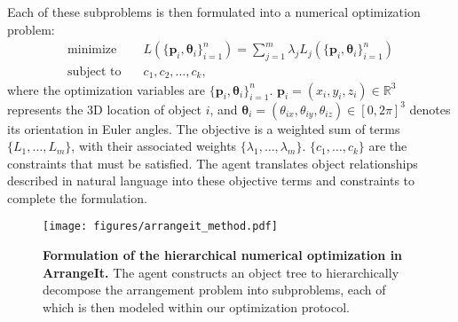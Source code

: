 Each of these subproblems is then formulated into a numerical optimization problem:
\begin{align*}
    \text{minimize} \quad & L(\{\mathbf{p}_i, \mathbf{\theta}_i\}_{i=1}^n) = \sum_{j=1}^{m} \lambda_j L_j(\{\mathbf{p}_i, \mathbf{\theta}_i\}_{i=1}^n) \\
    \text{subject to} \quad & c_1, c_2, \ldots, c_k,
\end{align*}
where the optimization variables are \(\{\mathbf{p}_i, \mathbf{\theta}_i\}_{i=1}^{n}\). \(\mathbf{p}_i = (x_i, y_i, z_i) \in \mathbb{R}^3\) represents the 3D location of object \(i\), and \(\mathbf{\theta}_i = (\theta_{ix}, \theta_{iy}, \theta_{iz}) \in [0, 2\pi]^3\) denotes its orientation in Euler angles.
The objective is a weighted sum of terms \(\{L_1, \ldots, L_m\}\), with their associated weights \(\{\lambda_1, \ldots, \lambda_m\}\). \(\{c_1, \ldots, c_k\}\) are the constraints that must be satisfied. The agent translates object relationships described in natural language into these objective terms and constraints to complete the formulation.

\begin{figure}[t]
\begin{center}
    \texttt{[image: figures/arrangeit\_method.pdf]}
\end{center}
\caption{\textbf{Formulation of the hierarchical numerical optimization  in ArrangeIt.} The agent constructs an object tree to hierarchically decompose the arrangement problem into subproblems, each of which is then modeled within our optimization protocol.} 
\label{fig:arrangeit_method}
\end{figure}


